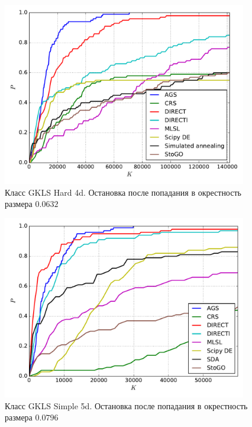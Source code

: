 \documentclass[a4paper]{article}
\begin{document}
\begin{figure}[H]
  \center
  \includegraphics[width=0.95\textwidth]{../experiments/gklsh4d_serg/cmc.pdf}
  \caption{Класс GKLS Hard 4d. Остановка после попадания в окрестность размера $0.0632$}
  \label{fig:}
\end{figure}


\begin{figure}[H]
  \center
  \includegraphics[width=0.95\textwidth]{../experiments/gklss5d_serg/cmc.pdf}
  \caption{Класс GKLS Simple 5d. Остановка после попадания в окрестность размера $0.0796$}
  \label{fig:}
\end{figure}

\end{document}
